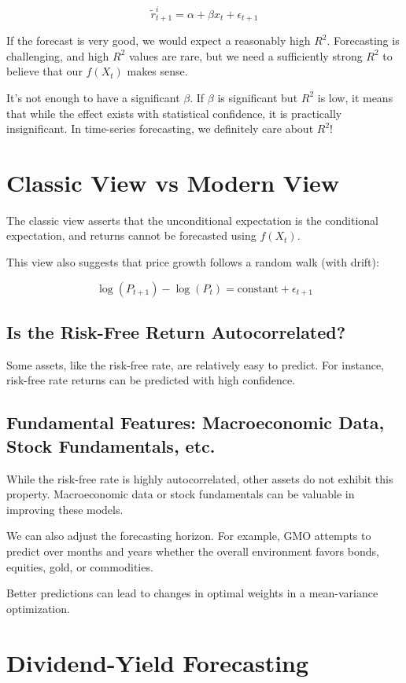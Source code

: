 \documentclass{article}
\begin{document}
$$\tilde{r}^i_{t+1} = \alpha + \beta x_t + \epsilon_{t+1}$$

If the forecast is very good, we would expect a reasonably high $R^2$. Forecasting is challenging, and high $R^2$ values are rare, but we need a sufficiently strong $R^2$ to believe that our $f(X_t)$ makes sense.

It’s not enough to have a significant $\beta$. If $\beta$ is significant but $R^2$ is low, it means that while the effect exists with statistical confidence, it is practically insignificant. In time-series forecasting, we definitely care about $R^2$!

\section{Classic View vs Modern View}

The classic view asserts that the unconditional expectation is the conditional expectation, and returns cannot be forecasted using $f(X_t)$.

This view also suggests that price growth follows a random walk (with drift):

$$
\log(P_{t+1}) - \log(P_t) = \text{constant} + \epsilon_{t+1}
$$

\subsection{Is the Risk-Free Return Autocorrelated?}

Some assets, like the risk-free rate, are relatively easy to predict. For instance, risk-free rate returns can be predicted with high confidence.

\subsection{Fundamental Features: Macroeconomic Data, Stock Fundamentals, etc.}

While the risk-free rate is highly autocorrelated, other assets do not exhibit this property. Macroeconomic data or stock fundamentals can be valuable in improving these models.

We can also adjust the forecasting horizon. For example, GMO attempts to predict over months and years whether the overall environment favors bonds, equities, gold, or commodities.

Better predictions can lead to changes in optimal weights in a mean-variance optimization.

\section{Dividend-Yield Forecasting}
\end{document}

